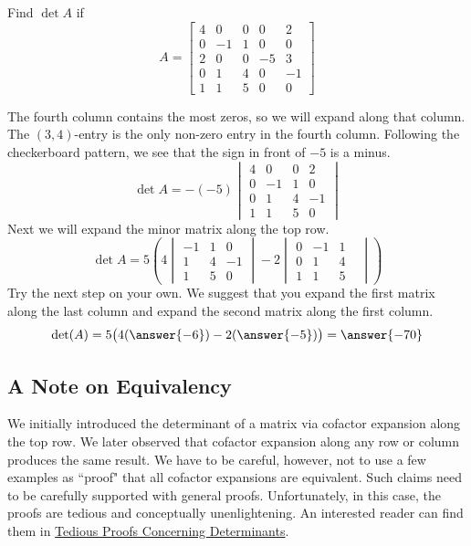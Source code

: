 \documentclass{ximera}
\begin{document}
\begin{example}\label{ex:laplace2}
Find $\det{A}$ if
$$A=\begin{bmatrix}4&0&0&0&2\\0&-1&1&0&0\\2&0&0&-5&3\\0&1&4&0&-1\\1&1&5&0&0\end{bmatrix}$$

\begin{explanation}
The fourth column contains the most zeros, so we will expand along that column.  The  $(3, 4)$-entry is the only non-zero entry in the fourth column.  Following the checkerboard pattern, we see that the sign in front of $-5$ is a minus.  
$$\det{A}=-(-5)\begin{vmatrix}4&0&0&2\\0&-1&1&0\\0&1&4&-1\\1&1&5&0\end{vmatrix}
$$
Next we will expand the minor matrix along the top row.
$$\det{A}=5\left(4\begin{vmatrix}-1&1&0\\1&4&-1\\1&5&0\end{vmatrix}-2\begin{vmatrix}0&-1&1\\0&1&4&\\1&1&5\end{vmatrix}\right)$$
Try the next step on your own.  We suggest that you expand the first matrix along the last column and expand the second matrix along the first column.
$$\det(A)=5\big(4(\answer{-6})-2(\answer{-5})\big)=\answer{-70}$$
\end{explanation}
\end{example}

\subsection*{A Note on Equivalency}
We initially introduced the determinant of a matrix via cofactor expansion along the top row.  We later observed that cofactor expansion along any row or column produces the same result.  We have to be careful, however, not to use a few examples as ``proof" that all cofactor expansions are equivalent.  Such claims need to be carefully supported with general proofs.  Unfortunately, in this case, the proofs are tedious and conceptually unenlightening.  An interested reader can find them in \href{https://ximera.osu.edu/linearalgebradzv3/LinearAlgebraInteractiveIntro/DET-0050/main}{Tedious Proofs Concerning Determinants}.
\end{document}
